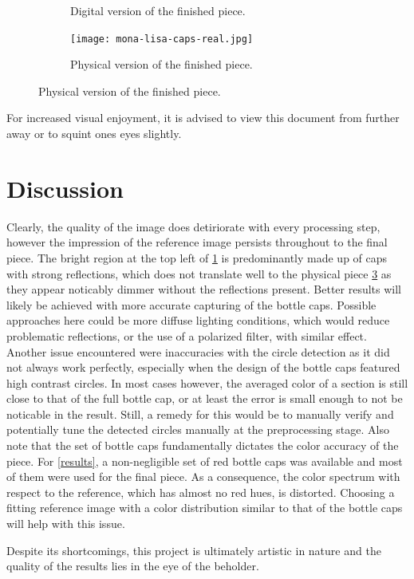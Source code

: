 \documentclass{article}
\begin{document}
\begin{figure}[h]
\begin{subfigure}[t]{0.3\linewidth}
		\caption{Digital version of the finished piece.}
		\label{fig:mona2}
        \end{subfigure}
	\hfill
        \begin{subfigure}[t]{0.3\linewidth}
		\centering
		\texttt{[image: mona-lisa-caps-real.jpg]}
		\caption{Physical version of the finished piece.}
		\label{fig:mona3}
        \end{subfigure}
\end{figure}
For increased visual enjoyment, it is advised to view this document from further away or to squint ones eyes slightly. 

\section{Discussion} \label{discussion}
Clearly, the quality of the image does detiriorate with every processing step, however the impression of the reference image persists throughout to the final piece. 
The bright region at the top left of \ref{fig:mona2} is predominantly made up of caps with strong reflections, which does not translate well to the physical piece \ref{fig:mona3} as they appear noticably dimmer without the reflections present.
Better results will likely be achieved with more accurate capturing of the bottle caps. Possible approaches here could be more diffuse lighting conditions, which would reduce problematic reflections, or the use of a polarized filter, with similar effect.
Another issue encountered were inaccuracies with the circle detection as it did not always work perfectly, especially when the design of the bottle caps featured high contrast circles. In most cases however, the averaged color of a section is still close to that of the full bottle cap, or at least the error is small enough to not be noticable in the result. 
Still, a remedy for this would be to manually verify and potentially tune the detected circles manually at the preprocessing stage. 
Also note that the set of bottle caps fundamentally dictates the color accuracy of the piece. For \ref{results}, a non-negligible set of red bottle caps was available and most of them were used for the final piece. As a consequence, the color spectrum with respect to the reference, which has almost no red hues, is distorted. Choosing a fitting reference image with a color distribution similar to that of the bottle caps will help with this issue. 

Despite its shortcomings, this project is ultimately artistic in nature and the quality of the results lies in the eye of the beholder.


\end{document}
